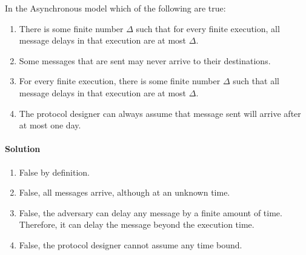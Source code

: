 \begin{xca}[Quiz 1.B]
    In the Asynchronous model which of the following are true:
    \begin{enumerate}
        \item There is some finite number $\Delta$ such that for every finite execution, all
         message delays in that execution are at most $\Delta$.
        \item Some messages that are sent may never arrive to their destinations.
        \item For every finite execution, there is some finite number $\Delta$ such that 
        all message delays in that execution are at most $\Delta$.
        \item The protocol designer can always assume that message sent will arrive after at most one day.
    \end{enumerate}
    \paragraph{Solution}
    \begin{enumerate}
        \item False by definition.
        \item False, all messages arrive, although at an unknown time.
        \item {} False, the adversary can delay any message by a finite 
        amount of time. Therefore, it can delay the message beyond the execution time.
        \item False, the protocol designer cannot assume any time bound.
    \end{enumerate}
\end{xca}


